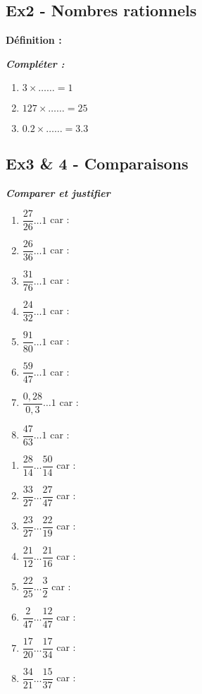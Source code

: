 \documentclass[11pt]{article}
\begin{document}
\subsection*{Ex2 - Nombres rationnels}

\textbf{Définition :} \dotfill

\textit{\textbf{Compléter :}}

\begin{multicols}{3}
  \begin{enumerate}
  \item $ 3 \times \ldots \ldots = 1$
  \item $ 127 \times \ldots \ldots = 25$
  \item $ 0.2 \times \ldots \ldots = 3.3$
  \end{enumerate}
\end{multicols}



\subsection*{Ex3 \& 4 - Comparaisons}
\textit{\textbf{Comparer et justifier}}

\begin{multicols}{2}

\begin{enumerate}
  \item $ \dfrac{27}{26} \ldots 1 $ car : \dotfill
  \item $ \dfrac{26}{36}  \ldots 1 $ car : \dotfill
  \item $ \dfrac{31}{76} \ldots 1 $ car : \dotfill
  \item $ \dfrac{24}{32} \ldots 1 $ car : \dotfill
  \item $ \dfrac{91}{80} \ldots 1 $ car : \dotfill
  \item $ \dfrac{59}{47} \ldots 1 $ car : \dotfill
  \item $ \dfrac{0,28}{0,3} \ldots 1 $ car : \dotfill
  \item $ \dfrac{47}{63} \ldots 1 $ car : \dotfill
\end{enumerate}

\columnbreak

\begin{enumerate}
\item $ \dfrac{28}{14} \ldots \dfrac{50}{14} $  car : \dotfill
\item $ \dfrac{33}{27} \ldots  \dfrac{27}{47}  $  car : \dotfill
\item $ \dfrac{23}{27} \ldots \dfrac{22}{19} $  car : \dotfill
\item $ \dfrac{21}{12} \ldots  \dfrac{21}{16}  $  car : \dotfill
\item $ \dfrac{22}{25} \ldots \dfrac{3}{2} $  car : \dotfill
\item $ \dfrac{2}{47} \ldots  \dfrac{12}{47} $  car : \dotfill
\item $ \dfrac{17}{20} \ldots \dfrac{17}{34} $  car : \dotfill
\item $ \dfrac{34}{21} \ldots \dfrac{15}{37} $  car : \dotfill
\end{enumerate}
\end{multicols}
\end{document}
